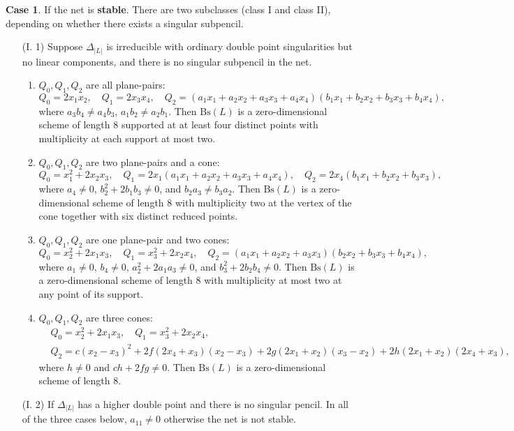\documentclass{amsart}[12pt]
\theoremstyle{definition}
\theoremstyle{remark}
\numberwithin{equation}{section}
\newcommand{\abs}[1]{\lvert#1\rvert}
\begin{document}
\textbf{Case 1}. If the net is \textbf{stable}. There are two subclasses (class I and class II), depending on whether there exists a singular subpencil.
\begin{itemize}
\item[(I. 1)] Suppose $\Delta_{\abs{L}}$ is irreducible with ordinary double point singularities but no linear components, and there is no singular subpencil in the net.
\begin{enumerate}
\item $Q_0, Q_1, Q_2$ are all plane-pairs: 
\[
Q_0 = 2x_1x_2, \quad Q_1 = 2x_3x_4, \quad Q_2 = (a_1x_1 + a_2x_2 + a_3x_3 + a_4x_4)(b_1x_1 + b_2x_2 + b_3x_3 + b_4x_4),
\]
where $a_3b_4 \neq a_4b_3$, $a_1b_2 \neq a_2b_1$. Then $\mathrm{Bs}(L)$ is a zero-dimensional scheme of length $8$ supported at at least four distinct points with multiplicity at each support at most two.
\item $Q_0, Q_1, Q_2$ are two plane-pairs and a cone:
\[
Q_0 = x_1^2 + 2x_2x_3, \quad Q_1 = 2x_1(a_1x_1 + a_2x_2 + a_3x_3 + a_4x_4), \quad Q_2 = 2x_4(b_1x_1 + b_2x_2 + b_3x_3),
\]
where $a_4 \neq 0$, $b_2^2 + 2b_1b_3 \neq 0$, and $b_2a_3 \neq b_3a_2$. Then $\mathrm{Bs}(L)$ is a zero-dimensional scheme of length $8$ with multiplicity two at the vertex of the cone together with six distinct reduced points. 
\item $Q_0, Q_1, Q_2$ are one plane-pair and two cones:
\[ 
Q_0 = x_2^2 + 2x_1x_3, \quad Q_1 = x_3^2 + 2x_2x_4, \quad Q_2 = (a_1x_1 + a_2x_2 + a_3x_3)(b_2x_2 + b_3x_3 + b_4x_4),
\]
where $a_1 \neq 0$, $b_4 \neq 0$, $a_2^2 + 2a_1a_3 \neq 0$, and $b_3^2 + 2b_2b_4 \neq 0$. Then $\mathrm{Bs}(L)$ is a zero-dimensional scheme of length $8$ with multiplicity at most two at any point of its support.
\item $Q_0, Q_1, Q_2$ are three cones:
\begin{align*}
& Q_0 = x_2^2 + 2x_1x_3, \quad Q_1 = x_3^2 + 2x_2x_4, \\
& Q_2 = c(x_2 - x_3)^2 + 2f(2x_4 + x_3)(x_2 - x_3) + 2g(2x_1 + x_2)(x_3 - x_2) + 2h(2x_1 + x_2)(2x_4 + x_3),
\end{align*}
where $h \neq 0$ and $ch + 2fg \neq 0$. Then $\mathrm{Bs}(L)$ is a zero-dimensional scheme of length $8$.
\end{enumerate}
\item[(I. 2)] If $\Delta_{\abs{L}}$ has a higher double point and there is no singular pencil. In all of the three cases below, $a_{11} \neq 0$ otherwise the net is not stable. 
\begin{enumerate}

\end{enumerate}
\end{itemize}
\end{document}
